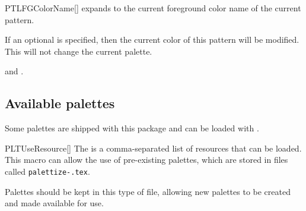 \documentclass[a4paper, 11pt]{article}
\begin{document}
\begin{macro}{PTLFGColorName}[]
     expands to the current foreground color name of the current pattern.

    If an optional  is specified, then the current color of this pattern will be modified. This will not change the current palette.
\end{macro}

\begin{example}{}

    \begin{center}
        \forcsvlist{%
            \textcolor{PLTBGColor}{\textbf{\PLTBGColorName}}, %
            \PLTNextColor%
        }{{}, {}, {}, {}, {}, {}}%
        and \textcolor{PLTBGColor}{\textbf{\PLTBGColorName}}.

        \medskip
        \PLTResetLoop
        \forcsvlist{%
            \textcolor{PLTBGColor}{\rule{1.15cm}{1em}}%
            \PLTNextColor%
        }{{}, {}, {}, {}, {}, {}, {}}%
    \end{center}
\end{example}

\subsection{Available palettes}\label{sec:available-palettes}

Some palettes are shipped with this package and can be loaded with .

\begin{macro}{PLTUseResource}[]
    The  is a comma-separated list of resources that can be loaded. This macro can allow the use of pre-existing palettes, which are stored in files called \texttt{palettize-.tex}.

    Palettes should be kept in this type of file, allowing new palettes to be created and made available for use.
\end{macro}

\begin{latexcode}
\end{latexcode}
\end{document}
